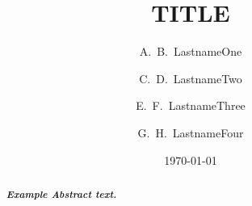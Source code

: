 \documentclass{article}			%
\begin{document}
\newcommand{\ke}{kinetic energy (KE)\renewcommand{\ke}{KE}}
\newcommand{\pe}{potential energy (PE)\renewcommand{\pe}{PE}}

\newcommand{\dash}{\textbf{---}\ } %
\newcommand{\bs}{\boldsymbol} %
\newcommand{\nucl}[2]{{}^{#1}\mbox{#2}} %

\title{TITLE}

\author{A.~B.~LastnameOne} %
\author{C.~D.~LastnameTwo}
\author{E.~F.~LastnameThree}
\author{G.~H.~LastnameFour}

\date{\today}

\begin{abstract}
\emph{\textbf{Example Abstract text.}}
\lipsum[91]
\end{abstract}








\end{document}
